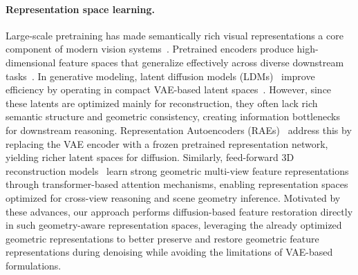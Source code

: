 \documentclass{llmxive}
\begin{document}


\paragraph{Representation space learning.}
Large-scale pretraining has made semantically rich visual representations a core component of modern vision systems~\cite{oquab2023dinov2, he2022masked, radford2021learning, tschannen2025siglip, lee2023domain}. Pretrained encoders produce high-dimensional feature spaces that generalize effectively across diverse downstream tasks~\cite{zheng2025diffusion, jang2026gld, tong2026scaling, kumar2026learning}. In generative modeling, latent diffusion models (LDMs)~\cite{rombach2022high, esser2024scaling, peebles2023scalable, kilian2024computational, kim2025unifieddiffusiontransformerhighfidelity, min2025text} improve efficiency by operating in compact VAE-based latent spaces~\cite{kingma2013auto}. However, since these latents are optimized mainly for reconstruction, they often lack rich semantic structure and geometric consistency, creating information bottlenecks for downstream reasoning. Representation Autoencoders (RAEs)~\cite{zheng2025diffusion, tong2026scaling, kumar2026learning} address this by replacing the VAE encoder with a frozen pretrained representation network, yielding richer latent spaces for diffusion. Similarly, feed-forward 3D reconstruction models~\cite{depthanything3, wang2025vggt, leroy2024grounding, wang2024dust3r, wang2025pi} learn strong geometric multi-view feature representations through transformer-based attention mechanisms, enabling representation spaces optimized for cross-view reasoning and scene geometry inference. Motivated by these advances, our approach performs diffusion-based feature restoration directly in such geometry-aware representation spaces, leveraging the already optimized geometric representations to better preserve and restore geometric feature representations during denoising while avoiding the limitations of VAE-based formulations.
\end{document}
